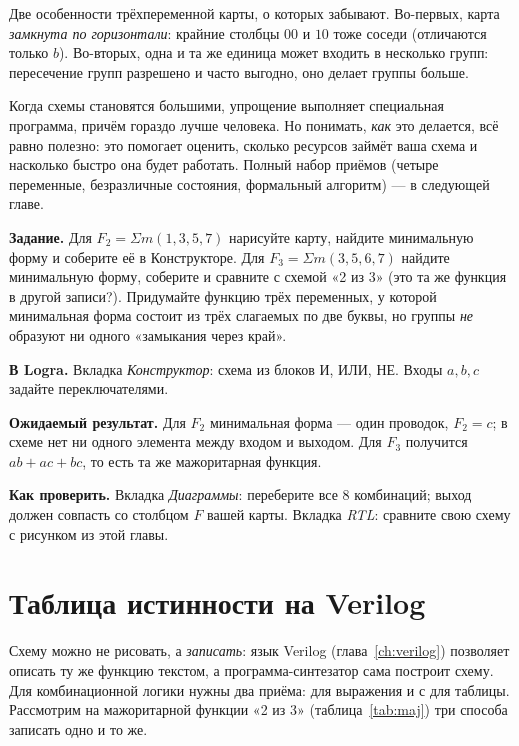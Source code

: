 Две особенности трёхпеременной карты, о которых забывают. Во-первых, карта
\emph{замкнута по горизонтали}: крайние столбцы $00$ и $10$ тоже соседи
(отличаются только $b$). Во-вторых, одна и та же единица может входить в
несколько групп: пересечение групп разрешено и часто выгодно, оно делает
группы больше.

\begin{infobox}
Когда схемы становятся большими, упрощение выполняет специальная программа,
причём гораздо лучше человека. Но понимать, \emph{как} это делается, всё
равно полезно: это помогает оценить, сколько ресурсов займёт ваша схема и
насколько быстро она будет работать. Полный набор приёмов (четыре
переменные, безразличные состояния, формальный алгоритм) --- в
следующей главе.
\end{infobox}

\begin{diybox}
\textbf{Задание.}  Для $F_2=\Sigma m(1,3,5,7)$ нарисуйте карту,
найдите минимальную форму и соберите её в Конструкторе.  Для
$F_3=\Sigma m(3,5,6,7)$ найдите минимальную форму, соберите и сравните с
схемой «2 из 3» (это та же функция в другой записи?).  Придумайте
функцию трёх переменных, у которой минимальная форма состоит из трёх
слагаемых по две буквы, но группы \emph{не} образуют ни одного «замыкания
через край».

\textbf{В Logra.} Вкладка \emph{Конструктор}: схема из блоков
И, ИЛИ, НЕ. Входы $a,b,c$ задайте переключателями.

\textbf{Ожидаемый результат.} Для $F_2$ минимальная форма --- один
проводок, $F_2=c$; в схеме нет ни одного элемента между входом и выходом.
Для $F_3$ получится $ab+ac+bc$, то есть та же мажоритарная функция.

\textbf{Как проверить.} Вкладка \emph{Диаграммы}: переберите все 8
комбинаций; выход должен совпасть со столбцом $F$ вашей карты. Вкладка
\emph{RTL}: сравните свою схему с рисунком из этой главы.
\end{diybox}

\section{Таблица истинности на Verilog}
\label{sec:comb-verilog}

Схему можно не рисовать, а \emph{записать}: язык Verilog (глава~\ref{ch:verilog})
позволяет описать ту же функцию текстом, а программа-синтезатор сама
построит схему. Для комбинационной логики нужны два приёма:
 для выражения и  с  для таблицы.
Рассмотрим на мажоритарной функции «2 из 3» (таблица~\ref{tab:maj}) три
способа записать одно и то же.

